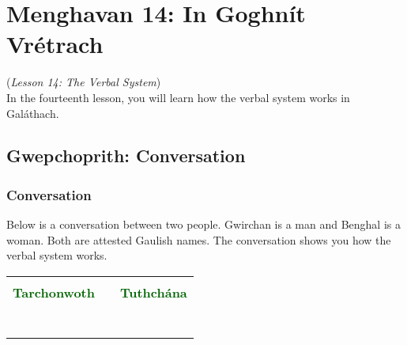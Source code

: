 \section{Menghavan 14: In Goghn\'{i}t Vr\'{e}trach}
(\textit{Lesson 14: The Verbal System})\\

In the fourteenth lesson, you will learn how the verbal system works in Gal\'{a}thach.

\subsection{Gwepchoprith: Conversation}
\subsubsection{Conversation}

Below is a conversation between two people. Gwirchan is a man and Benghal is a woman. Both are attested Gaulish names. The conversation shows you how the verbal system works.

\begin{table}[H]
\centering
    \begin{tabular}{cM{10.0cm}c}
     &  & \\
    \textcolor{darkgreen}{\textbf{Tarchonwoth}} &  & \textcolor{darkgreen}{\textbf{Tuthch\'{a}na}}\\
     &  & \\
     &  & \\
     &  & \\
     &  & \\
     &  & \\
     &  & \\
     &  & 
    \end{tabular}
\end{table}

